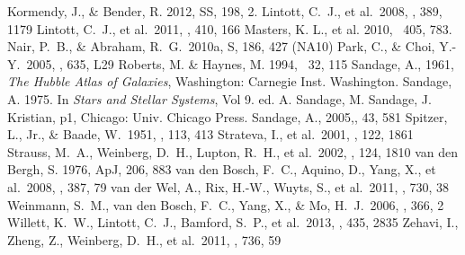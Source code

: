 \begin{thebibliography}{}
 Kormendy, J., \& Bender, R. 2012, \apj SS, 198, 2. 
 Lintott, C.~J., et al.\ 2008, \mnras, 389, 1179 %
 Lintott, C.~J., et al.\ 2011, \mnras, 410, 166%
 Masters, K. L., et al. 2010, \mnras ~405, 783.  %
 Nair, P.~B., \& Abraham, R.~G.\ 2010a, \apj S, 186, 427 (NA10) %
 Park, C., \& Choi, Y.-Y.\ 2005, \apjl, 635, L29  %
 Roberts, M. \& Haynes, M. 1994, \araa ~32, 115 %
 Sandage, A., 1961, {\it The Hubble Atlas of Galaxies}, Washington: Carnegie Inst. Washington.
 Sandage, A. 1975. In {\it Stars and Stellar Systems}, Vol 9. ed. A. Sandage, M. Sandage, J. Kristian, p1, Chicago: Univ. Chicago Press.
 Sandage, A., 2005,\araa, 43, 581
 Spitzer, L., Jr., \& Baade, W.\ 1951, \apj, 113, 413 %
 Strateva, I., et al.\ 2001, \aj, 122, 1861 %
 Strauss, M.~A., Weinberg, D.~H., Lupton, R.~H., et al.\ 2002, \aj, 124, 1810 %
 van den Bergh, S. 1976, ApJ, 206, 883
 van den Bosch, F.~C., Aquino, D., Yang, X., et al.\ 2008, \mnras, 387, 79 %
 van der Wel, A., Rix, H.-W., Wuyts, S., et al.\ 2011, \apj, 730, 38 %
 Weinmann, S.~M., van den Bosch, F.~C., Yang, X., \& Mo, H.~J.\ 2006, \mnras, 366, 2  %
 Willett, K.~W., Lintott, C.~J., Bamford, S.~P., et al.\ 2013, \mnras, 435, 2835 
 Zehavi, I., Zheng, Z., Weinberg, D.~H., et al.\ 2011, \apj, 736, 59  %
\end{thebibliography}